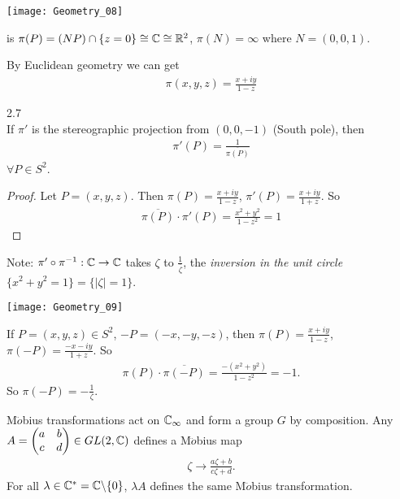 \documentclass[a4paper]{article}
\begin{document}
\texttt{[image: Geometry\_08]}

is $\pi(P) = (NP) \cap \{z=0\} \cong \mathbb{C} \cong \mathbb{R}^2$, $\pi(N) =\infty$ where $N=(0,0,1)$.

By Euclidean geometry we can get
\begin{equation*}
\begin{aligned}
\pi(x,y,z) = \frac{x+iy}{1-z}
\end{aligned}
\end{equation*}

\begin{lemma} 2.7\\
If $\pi'$ is the stereographic projection from $(0,0,-1)$ (South pole), then
\begin{equation*}
\begin{aligned}
\pi'(P) = \frac{1}{\overline{\pi(P)}}
\end{aligned}
\end{equation*}
$\forall P \in S^2$.
\begin{proof}
Let $P=(x,y,z)$. Then $\pi(P) = \frac{x+iy}{1-z}$, $\pi'(P) = \frac{x+iy}{1+z}$. So
\begin{equation*}
\begin{aligned}
\overline{\pi(P)} \cdot \pi'(P) = \frac{x^2+y^2}{1-z^2} = 1
\end{aligned}
\end{equation*}
\end{proof}
\end{lemma}

Note: $\pi' \circ \pi^{-1}: \mathbb{C} \to \mathbb{C}$ takes $\zeta$ to $\frac{1}{\overline{\zeta}}$, the \emph{inversion in the unit circle} $\{x^2+y^2=1\} = \{|\zeta| = 1\}$.

\texttt{[image: Geometry\_09]}

If $P=(x,y,z) \in S^2$, $-P = (-x,-y,-z)$, then $\pi(P) = \frac{x+iy}{1-z}$, $\pi(-P) = \frac{-x-iy}{1+z}$. So
\begin{equation*}
\begin{aligned}
\pi(P) \cdot \overline{\pi(-P)} = \frac{-(x^2+y^2)}{1-z^2} = -1.
\end{aligned}
\end{equation*}
So $\pi(-P) = -\frac{1}{\zeta}$.

M$\ddot{o}$bius transformations act on $\mathbb{C}_\infty$ and form a group $G$ by composition. Any $A=\left(\begin{matrix}
a &b\\
c&d
\end{matrix}\right) \in GL(2,\mathbb{C})$ defines a M$\ddot{o}$bius map
\begin{equation*}
\begin{aligned}
\zeta \to \frac{a\zeta + b}{c\zeta + d}.
\end{aligned}
\end{equation*}
For all $\lambda \in \mathbb{C}^* = \mathbb{C} \backslash\{0\}$, $\lambda A$ defines the same M$\ddot{o}$bius transformation.
\end{document}
